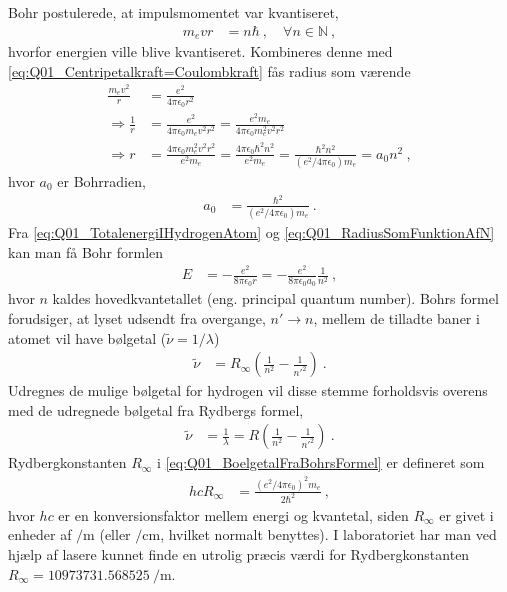 Bohr postulerede, at impulsmomentet var kvantiseret,
\begin{align}
    m_e v r &= n\hbar \: , \quad \forall n\in \mathbb{N} \: ,
\end{align}
hvorfor energien ville blive kvantiseret.
Kombineres denne med \cref{eq:Q01_Centripetalkraft=Coulombkraft} fås radius som værende
\begin{align} \label{eq:Q01_RadiusSomFunktionAfN}
    \frac{m_e v^2}{r} &= \frac{e^2}{4\pi\epsilon_0 r^2} \nonumber\\
    \Rightarrow \frac{1}{r} &= \frac{e^2}{4\pi\epsilon_0 m_e v^2 r^2} = \frac{e^2 m_e}{4\pi\epsilon_0 m_e^2 v^2 r^2} \nonumber\\
    \Rightarrow r &= \frac{4\pi\epsilon_0 m_e^2 v^2 r^2}{e^2 m_e} = \frac{4\pi\epsilon_0 \hbar^2 n^2}{e^2 m_e} = \frac{\hbar^2 n^2}{\left(e^2/4\pi\epsilon_0\right) m_e} = a_0 n^2 \: ,
\end{align}
hvor $a_0$ er Bohrradien,
\begin{align}
    a_0 &= \frac{\hbar^2}{\left(e^2/4\pi\epsilon_0\right) m_e} \: .
\end{align}
Fra \cref{eq:Q01_TotalenergiIHydrogenAtom} og \cref{eq:Q01_RadiusSomFunktionAfN} kan man få Bohr formlen
\begin{align} \label{eq:Q01_BohrsFormel}
    E &= - \frac{e^2}{8\pi\epsilon_0 r} = - \frac{e^2}{8\pi\epsilon_0 a_0} \frac{1}{n^2} \: ,
\end{align}
hvor $n$ kaldes \textsf{hovedkvantetallet} (eng. principal quantum number).
Bohrs formel forudsiger, at lyset udsendt fra overgange, $n' \rightarrow n$, mellem de tilladte baner i atomet vil have bølgetal ($\tilde{\nu} = 1/\lambda$)
\begin{align} \label{eq:Q01_BoelgetalFraBohrsFormel}
    \tilde{\nu} &= R_\infty \left(\frac{1}{n^2} - \frac{1}{n'^2}\right) \: .
\end{align}
Udregnes de mulige bølgetal for hydrogen vil disse stemme forholdsvis overens med de udregnede bølgetal fra Rydbergs formel,
\begin{align}
    \tilde{\nu} &= \frac{1}{\lambda} = R \left(\frac{1}{n^2} - \frac{1}{n'^2}\right) \: .
\end{align}
Rydbergkonstanten $R_\infty$ i \cref{eq:Q01_BoelgetalFraBohrsFormel} er defineret som
\begin{align}
    hcR_\infty &= \frac{\left(e^2/4\pi\epsilon_0\right)^2 m_e}{2\hbar^2} \: ,
\end{align}
hvor $hc$ er en konversionsfaktor mellem energi og kvantetal, siden $R_\infty$ er givet i enheder af $\si{\per\metre}$ (eller $\si{\per\centi\metre}$, hvilket normalt benyttes). I laboratoriet har man ved hjælp af lasere kunnet finde en utrolig præcis værdi for Rydbergkonstanten $R_\infty = \SI{10973731.568525}{\per\metre}$.

